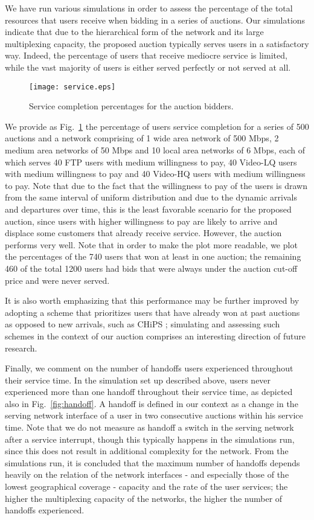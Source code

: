 \documentclass[a4paper]{article}
\begin{document}
We have run various simulations in order to assess the percentage of the
total resources that users receive when bidding in a series of auctions.
Our simulations indicate that due to the hierarchical form of the network
and its large multiplexing capacity, the proposed auction typically serves
users in a satisfactory way. Indeed, the percentage of users that receive 
mediocre service is limited, while the vast majority of users is either 
served perfectly or not served at all. 

\begin{figure}[htbp]
	\centering\texttt{[image: service.eps]}
	\caption{Service completion percentages for the auction bidders.}
	\label{fig:service}
\end{figure}

We provide as Fig.~\ref{fig:service}  the percentage of users
service completion for  a series of 500 auctions and a network comprising of
1 wide area network of 500 Mbps, 2 medium area networks of 50 Mbps and
10 local area networks of 6 Mbps, each of which serves 40 FTP users with
medium willingness to pay, 40 Video-LQ users with medium willingness to pay and
40 Video-HQ users with medium willingness to pay. Note that due to the fact
that the willingness to pay of the users is drawn from the same interval
of uniform distribution and due to the dynamic arrivals and departures over
time, this is the least favorable scenario for the proposed auction, since 
users with higher willingness to pay are likely to arrive and displace some
customers that already receive service. However, the auction performs very
well. Note that in order to make the plot more readable, we plot the percentages
of the 740 users that won at least in one auction; the remaining 460 of the total
1200 users had bids that were always under the auction cut-off price and were
never served.

It is also worth emphasizing that this performance may be further
improved by adopting a scheme that prioritizes users that have already won 
at past auctions as opposed to new arrivals, such as CHiPS \cite{chips};
simulating and assessing such schemes in the context of our auction comprises
an interesting direction of future research.

Finally, we comment on the number of handoffs users experienced throughout
their service time. In the simulation set up described above, users never
experienced more than one handoff throughout their service time, as 
depicted also in Fig.~\ref{fig:handoff}. A handoff
is defined in our context as a change in the serving network interface of
a user in two consecutive auctions within his service time. Note that we
do not measure as handoff a switch in the serving network after a service
interrupt, though this typically happens in the simulations run, 
since this does not result in additional complexity for the
network. From the simulations run, it is concluded that the maximum number
of handoffs depends heavily on the relation of the network interfaces - and 
especially those of the lowest geographical coverage - capacity
and the rate of the user services; the higher the multiplexing capacity
of the networks, the higher the number of handoffs experienced.
\end{document}
